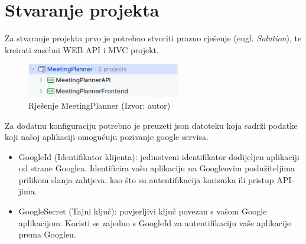 \documentclass{foi}
\begin{document}
\section{Stvaranje projekta}
Za stvaranje projekta prvo je potrebno stvoriti prazno rješenje (engl. \textit{Solution}), te kreirati zasebni WEB API i MVC projekt.
\begin{figure}[H]
    \centering
    \includegraphics[width=0.6\textwidth]{slike/struktura.png}
    \caption{Rješenje MeetingPlanner (Izvor: autor)}
    \label{fig:struktura}

\end{figure}
Za dodatnu konfiguraciju potrebno je preuzeti json datoteku koja sadrži podatke koji našoj aplikaciji omogućuju pozivanje google servisa. 
\begin{itemize}
    \item GoogleId (Identifikator klijenta): jedinstveni identifikator dodijeljen aplikaciji od strane Googlea. Identificira vašu aplikaciju na Googleovim poslužiteljima prilikom slanja zahtjeva, kao što su autentifikacija korisnika ili pristup API-jima.
    \item GoogleSecret (Tajni ključ): povjerljivi ključ povezan s vašom Google aplikacijom. Koristi se zajedno s GoogleId za autentifikaciju vaše aplikacije prema Googleu.
\end{itemize}
\newpage
\end{document}

